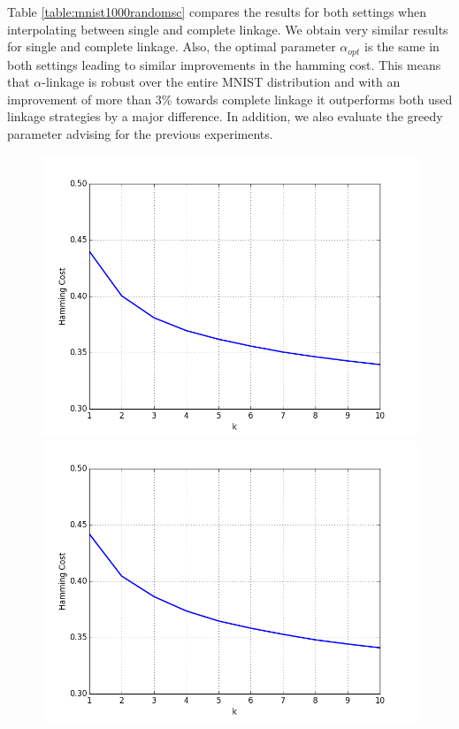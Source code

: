 Table \ref{table:mnist1000randomsc} compares the results for both settings when interpolating between single and complete linkage. We obtain very similar results for single and complete linkage. Also, the optimal parameter $\alpha_{opt}$ is the same in both settings leading to similar improvements in the hamming cost. This means that $\alpha$-linkage is robust over the entire MNIST distribution and with an improvement of more than $3\%$ towards complete linkage it outperforms both used linkage strategies by a major difference. In addition, we also evaluate the greedy parameter advising for the previous experiments.\\

\begin{figure}[h]
\centering
\begin{minipage}{.45\textwidth}
  \centering
  \includegraphics[width=\linewidth]{plots/mnist-sc-top-10}
\end{minipage}
\begin{minipage}{.45\textwidth}
  \centering
  \includegraphics[width=\linewidth]{plots/mnist-sc-random-top-10}
\end{minipage}
\caption{}
\label{fig:mnistsctop10}
\end{figure}

